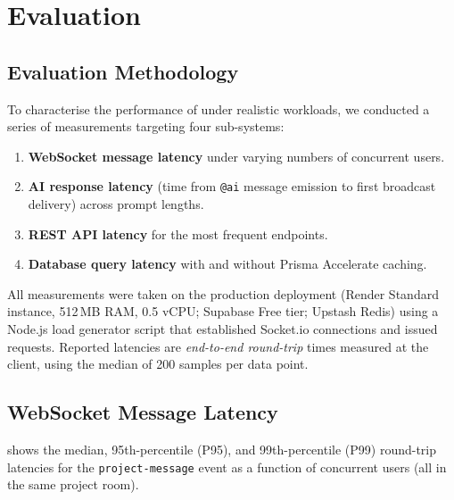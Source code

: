 \section{Evaluation}
\label{sec:evaluation}

\subsection{Evaluation Methodology}

To characterise the performance of \echoray{} under realistic workloads, we
conducted a series of measurements targeting four sub-systems:

\begin{enumerate}[leftmargin=*, label=(\roman*)]
  \item \textbf{WebSocket message latency} under varying numbers of concurrent
    users.
  \item \textbf{AI response latency} (time from \texttt{@ai} message emission
    to first broadcast delivery) across prompt lengths.
  \item \textbf{REST API latency} for the most frequent endpoints.
  \item \textbf{Database query latency} with and without Prisma Accelerate
    caching.
\end{enumerate}

All measurements were taken on the production deployment (Render Standard
instance, 512\,MB RAM, 0.5 vCPU; Supabase Free tier; Upstash Redis) using a
Node.js load generator script that established Socket.io connections and
issued requests. Reported latencies are \emph{end-to-end round-trip} times
measured at the client, using the median of 200 samples per data point.

\subsection{WebSocket Message Latency}

 shows the median, 95th-percentile (P95), and
99th-percentile (P99) round-trip latencies for the \texttt{project-message}
event as a function of concurrent users (all in the same project room).

